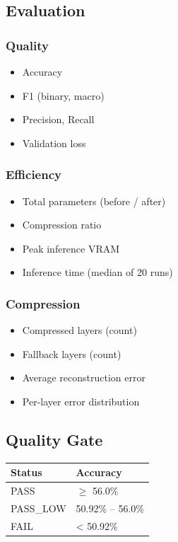 \subsection{Evaluation}

\subsubsection{Quality}

\begin{itemize}
\item Accuracy
\item F1 (binary, macro)
\item Precision, Recall
\item Validation loss

\end{itemize}
\subsubsection{Efficiency}

\begin{itemize}
\item Total parameters (before / after)
\item Compression ratio
\item Peak inference VRAM
\item Inference time (median of 20 runs)

\end{itemize}
\subsubsection{Compression}

\begin{itemize}
\item Compressed layers (count)
\item Fallback layers (count)
\item Average reconstruction error
\item Per-layer error distribution

\end{itemize}
\subsection{Quality Gate}

\begin{table}[H]
\centering
\small
\begin{tabular}{ll}
\toprule
\textbf{Status} & \textbf{Accuracy} \\
\midrule
PASS & $\ge$ 56.0\% \\
PASS\_LOW & 50.92\% -- 56.0\% \\
FAIL & \textless{} 50.92\% \\
\bottomrule
\end{tabular}
\end{table}

